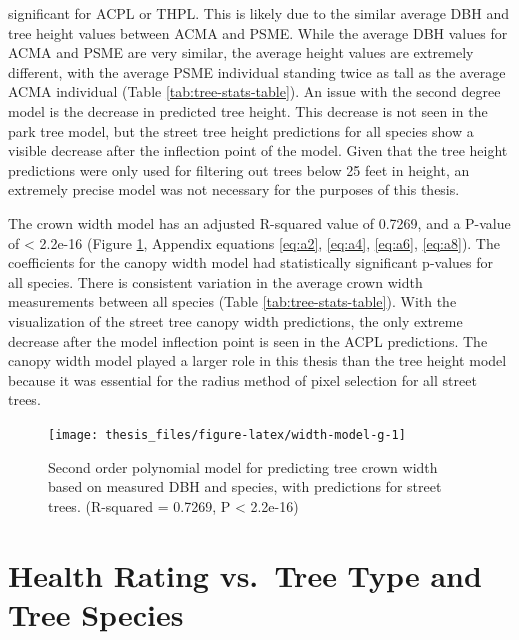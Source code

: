 \documentclass[12pt,twoside]{reedthesis}
\begin{document}
significant for ACPL or THPL. This is likely due to the similar average
DBH and tree height values between ACMA and PSME. While the average DBH
values for ACMA and PSME are very similar, the average height values are
extremely different, with the average PSME individual standing twice as
tall as the average ACMA individual (Table \ref{tab:tree-stats-table}).
An issue with the second degree model is the decrease in predicted tree
height. This decrease is not seen in the park tree model, but the street
tree height predictions for all species show a visible decrease after
the inflection point of the model. Given that the tree height
predictions were only used for filtering out trees below 25 feet in
height, an extremely precise model was not necessary for the purposes of
this thesis.

The crown width model has an adjusted R-squared value of 0.7269, and a
P-value of \textless{} 2.2e-16 (Figure \ref{fig:width-model-g}, Appendix
equations \eqref{eq:a2}, \eqref{eq:a4}, \eqref{eq:a6}, \eqref{eq:a8}). The
coefficients for the canopy width model had statistically significant
p-values for all species. There is consistent variation in the average
crown width measurements between all species (Table
\ref{tab:tree-stats-table}). With the visualization of the street tree
canopy width predictions, the only extreme decrease after the model
inflection point is seen in the ACPL predictions. The canopy width model
played a larger role in this thesis than the tree height model because
it was essential for the radius method of pixel selection for all street
trees.
\begin{figure}[H]

{\centering \texttt{[image: thesis\_files/figure-latex/width-model-g-1]} 

}

\caption[Crown width predictive model]{Second order polynomial model for predicting tree crown width based on measured DBH and species, with predictions for street trees. (R-squared = 0.7269,  P < 2.2e-16)}\label{fig:width-model-g}
\end{figure}
\hypertarget{health-rating-vs.-tree-type-and-tree-species}{%
\section{Health Rating vs.~Tree Type and Tree Species}\label{health-rating-vs.-tree-type-and-tree-species}}
\end{document}
